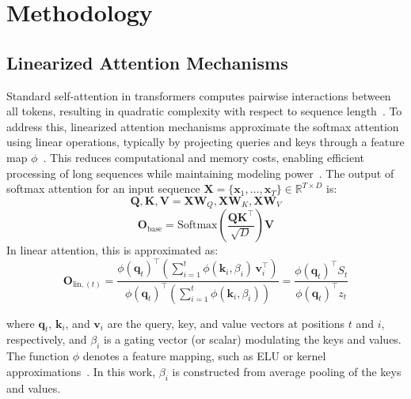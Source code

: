 \documentclass[10pt,a4paper]{article}
\begin{document}
\section{Methodology}

\subsection{Linearized Attention Mechanisms}

Standard self-attention in transformers computes pairwise interactions between all tokens, resulting in quadratic complexity with respect to sequence length~\cite{vaswani2017attention}. To address this, linearized attention mechanisms approximate the softmax attention using linear operations, typically by projecting queries and keys through a feature map $\phi$~\cite{katharopoulos2020transformers, wang2020linformer, mercat2024linearizing, yang2024parallelizing}. This reduces computational and memory costs, enabling efficient processing of long sequences while maintaining modeling power~\cite{gu2023mamba, dao2023flashattention, zhang2024lolcats, lan2025liger}. The output of softmax attention for an input sequence $\mathbf{X} = \{\mathbf{x}_1, \dots, \mathbf{x}_T\} \in \mathbb{R}^{T \times D}$ is:
\begin{equation}
\mathbf{Q}, \mathbf{K}, \mathbf{V} = \mathbf{X}\mathbf{W}_Q, \mathbf{X}\mathbf{W}_K, \mathbf{X}\mathbf{W}_V
\end{equation}
\begin{equation}
\mathbf{O}_{\text{base}} = \text{Softmax}\left(\frac{\mathbf{Q}\mathbf{K}^\top}{\sqrt{D}}\right)\mathbf{V}
\end{equation}
In linear attention, this is approximated as:
\begin{equation}
\mathbf{O}_{\text{lin}, (t)} = 
\frac{
\phi(\mathbf{q}_t)^\top \left( \sum_{i=1}^t \phi(\mathbf{k}_i, \beta_i)\, \mathbf{v}_i^\top \right)}{
\phi(\mathbf{q}_t)^\top \left( \sum_{i=1}^t \phi(\mathbf{k}_i, \beta_i) \right)} 
= \frac{\phi(\mathbf{q}_t)^\top S_t}{\phi(\mathbf{q}_t)^\top z_t}
\end{equation}

where $\mathbf{q}_t$, $\mathbf{k}_i$, and $\mathbf{v}_i$ are the query, key, and value vectors at positions $t$ and $i$, respectively, and $\beta_i$ is a gating vector (or scalar) modulating the keys and values. The function $\phi$ denotes a feature mapping, such as ELU or kernel approximations~\cite{wang2020linformer}. In this work, $\beta_i$ is constructed from average pooling of the keys and values.
\end{document}
